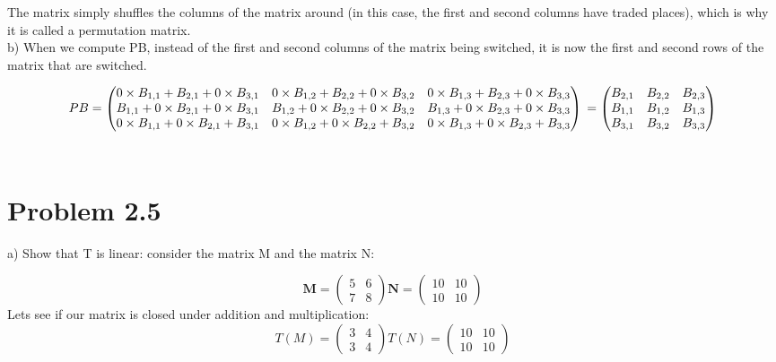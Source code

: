 \documentclass{article}
\begin{document}
The matrix simply shuffles the columns of the matrix around (in this case, the first and second columns have traded places), which is why it is called a permutation matrix. 
\\

b) When we compute PB, instead of the first and second columns of the matrix being switched, it is now the first and second rows of the matrix that are switched.

\begin{equation}
    PB = 
    \begin{pmatrix}
    0\times B_{1,1} + B_{2,1} + 0\times B_{3,1} & 0\times B_{1,2} + B_{2,2} + 0\times  B_{3,2}  & 0\times B_{1,3} +  B_{2,3} + 0\times B_{3,3}\\
    B_{1,1} + 0\times B_{2,1} + 0\times B_{3,1} & B_{1,2} + 0\times B_{2,2} + 0\times  B_{3,2}  & B_{1,3} + 0\times B_{2,3} + 0\times B_{3,3}\\
    0 \times B_{1,1} + 0\times B_{2,1} + B_{3,1} & 0\times B_{1,2} + 0\times B_{2,2} +  B_{3,2}  & 0\times B_{1,3} + 0\times B_{2,3} + B_{3,3}
    \end{pmatrix} 
    \newline
    =
    \begin{pmatrix}
    B_{2,1} & B_{2,2} & B_{2,3}\\
    B_{1,1} & B_{1,2} & B_{1,3}\\
    B_{3,1} & B_{3,2} & B_{3,3}\\
    \end{pmatrix}
\end{equation}
\\



\break
\section{Problem 2.5}
a) Show that T is linear: consider the matrix M and the matrix N:

$$ \textbf{M}=\begin{pmatrix}
    5 & 6\\
    7 & 8
\end{pmatrix}
\textbf{N}=\begin{pmatrix}
    10 & 10\\
    10 & 10
\end{pmatrix}$$
Lets see if our matrix is closed under addition and multiplication:
$$
T(M) =\begin{pmatrix}
    3 & 4\\
    3 & 4
\end{pmatrix}
T(N) =\begin{pmatrix}
    10 & 10\\
    10 & 10
\end{pmatrix}
$$
\end{document}
